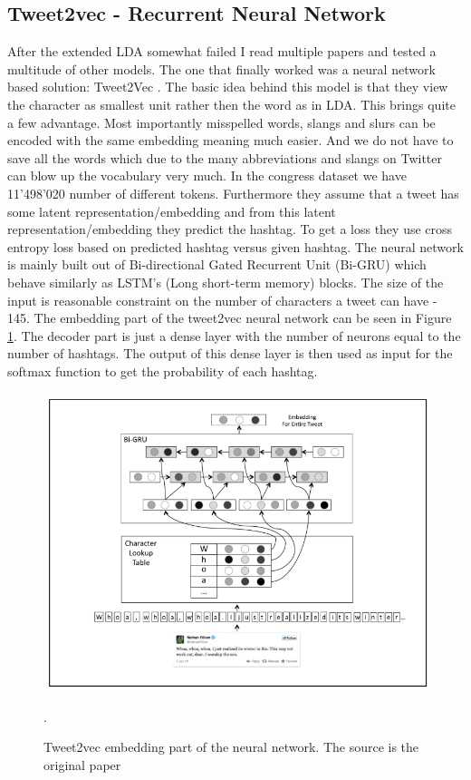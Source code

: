 \documentclass[10pt,conference,compsocconf]{IEEEtran}
\begin{document}
\subsection{Tweet2vec - Recurrent Neural Network}
After the extended LDA somewhat failed I read multiple papers and tested a multitude of other models. The one that finally worked was a neural network based solution: Tweet2Vec \cite{DhingraZFMC16}. The basic idea behind this model is that they view the character as smallest unit rather then the word as in LDA. This brings quite a few advantage. Most importantly misspelled words, slangs and slurs can be encoded with the same embedding meaning much easier. And we do not have to save all the words which due to the many abbreviations and slangs on Twitter can blow up the vocabulary very much. In the congress dataset we have 11'498'020 number of different tokens. Furthermore they assume that a tweet has some latent representation/embedding and from this latent representation/embedding they predict the hashtag. To get a loss they use cross entropy loss based on predicted hashtag versus given hashtag. The neural network is mainly built out of Bi-directional Gated Recurrent Unit (Bi-GRU) which behave similarly as LSTM's (Long short-term memory) blocks. The size of the input is reasonable constraint on the number of characters a tweet can have - 145. The embedding part of the tweet2vec neural network can be seen in Figure \ref{fig:tweet2vecembedding}. The decoder part is just a dense layer with the number of neurons equal to the number of hashtags. The output of this dense layer is then used as input for the softmax function to get the probability of each hashtag. 
\begin{figure}
	\centering
	\includegraphics[width=0.7\linewidth]{images/tweet2vec_embedding}
	\caption{Tweet2vec embedding part of the neural network. The source is the original paper \cite{DhingraZFMC16}}.
	\label{fig:tweet2vecembedding}
\end{figure}
\end{document}
